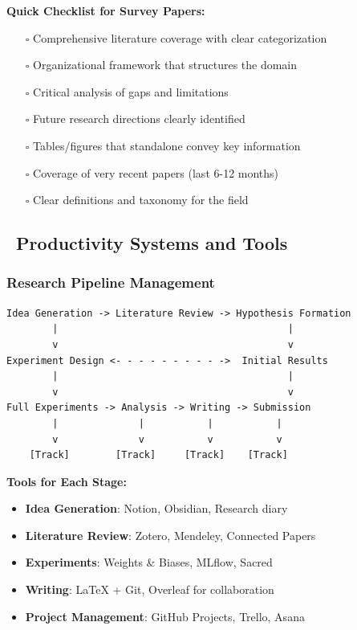 \documentclass[11pt,a4paper]{article}
\newcommand{\toolitem}{\item[\color{blue!70!black}\faCog]}
\begin{document}
\textbf{Quick Checklist for Survey Papers:}
\begin{enumerate}
    \item[$\square$] Comprehensive literature coverage with clear categorization
    \item[$\square$] Organizational framework that structures the domain
    \item[$\square$] Critical analysis of gaps and limitations
    \item[$\square$] Future research directions clearly identified
    \item[$\square$] Tables/figures that standalone convey key information
    \item[$\square$] Coverage of very recent papers (last 6-12 months)
    \item[$\square$] Clear definitions and taxonomy for the field
\end{enumerate}

\subsection{\faCogs~Productivity Systems and Tools}

\subsubsection{Research Pipeline Management}

\begin{verbatim}
Idea Generation -> Literature Review -> Hypothesis Formation
        |                                        |
        v                                        v
Experiment Design <- - - - - - - - - ->  Initial Results
        |                                        |
        v                                        v
Full Experiments -> Analysis -> Writing -> Submission
        |              |           |           |
        v              v           v           v
    [Track]        [Track]     [Track]    [Track]
\end{verbatim}

\textbf{Tools for Each Stage:}
\begin{itemize}
    \toolitem \textbf{Idea Generation}: Notion, Obsidian, Research diary
    \toolitem \textbf{Literature Review}: Zotero, Mendeley, Connected Papers
    \toolitem \textbf{Experiments}: Weights \& Biases, MLflow, Sacred
    \toolitem \textbf{Writing}: LaTeX + Git, Overleaf for collaboration
    \toolitem \textbf{Project Management}: GitHub Projects, Trello, Asana
\end{itemize}
\end{document}
